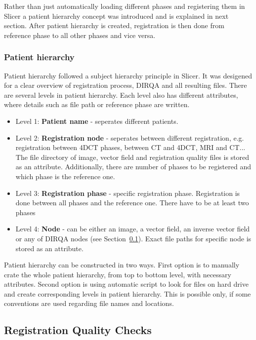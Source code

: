 \documentclass[type=dr, dr=rernat, accentcolor=tud7b,colorbacktitle, bigchapter, openright, twoside, 12pt ]{tudthesis}
\begin{document}
Rather than just automatically loading different phases and registering them in Slicer a patient hierarchy concept was introduced and is explained in next section. After patient hierarchy is created, registration is then done from reference phase to all other phases and vice versa. 

\subsubsection{Patient hierarchy} 

Patient hierarchy followed a subject hierarchy principle in Slicer. It was desigened for a clear overview of registration process, DIRQA and all resulting files. There are several levels in patient hierarchy. Each level also has different attributes,
where details such as file path or reference phase are written.

\begin{itemize}
	\item Level 1: \textbf{Patient name} - seperates different patients.
	\item Level 2: \textbf{Registration node} - seperates between different registration, e.g. registration between 4DCT phases, between CT and 4DCT, MRI and CT... 
	\subitem The file directory of image, vector field and registration quality files is stored as an attribute. Additionally, there are number of phases to be registered and which phase is the reference one.
	\item Level 3: \textbf{Registration phase} - specific registration phase. Registration is done between all phases and the reference one. There have to be at least two phases
	\item Level 4: \textbf{Node} - can be either an image, a vector field, an inverse vector field or any of DIRQA nodes (see Section~\ref{DIRQA}).
	\subitem Exact file paths for specific node is stored as an attribute.
\end{itemize}

Patient hierarchy can be constructed in two ways. First option is to manually crate the whole patient hierarchy, from top to bottom level, with necessary attributes. Second option is using automatic script to look for files on hard drive and create corresponding levels in patient hierarchy. This
is possible only, if some conventions are used regarding file names and locations.

\subsection{Registration Quality Checks}
\label{DIRQA}
\end{document}
